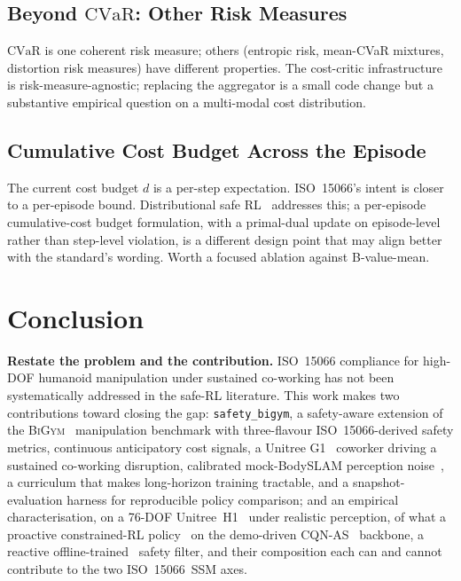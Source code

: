 \documentclass[11pt,a4paper]{report}
\newcommand{\ssm}{SSM}
\newcommand{\iso}{ISO~15066}
\newcommand{\cvar}{\ensuremath{\mathrm{CVaR}}}
\newcommand{\bigym}{\textsc{BiGym}}
\newcommand{\sbigym}{\texttt{safety\_bigym}}
\newcommand{\cqnas}{CQN-AS}
\newcommand{\bodyslampp}{BodySLAM\nolinebreak[4]\hspace{-.05em}\raisebox{.2ex}{\scriptsize ++}}
\begin{document}
\section{Beyond \cvar{}: Other Risk Measures}
\label{sec:fw:risk-measures}

\cvar{} is one coherent risk measure; others (entropic risk,
mean-CVaR mixtures, distortion risk measures) have different
properties. The cost-critic infrastructure is risk-measure-agnostic;
replacing the aggregator is a small code change but a substantive
empirical question on a multi-modal cost distribution.

\section{Cumulative Cost Budget Across the Episode}
\label{sec:fw:cumulative}

The current cost budget $d$ is a per-step expectation. \iso{}'s
intent is closer to a per-episode bound. Distributional safe
RL~\cite{yang2021wcsac} addresses this; a per-episode cumulative-cost
budget formulation, with a primal-dual update on episode-level
rather than step-level violation, is a different design point that
may align better with the standard's wording. Worth a focused
ablation against B-value-mean.


\chapter{Conclusion}
\label{ch:conclusion}

\noindent
\textbf{Restate the problem and the contribution.}
\iso{} compliance for high-DOF humanoid manipulation under
sustained co-working has not been systematically addressed in the
safe-RL literature. This work makes two contributions toward
closing the gap: \sbigym{}, a safety-aware extension of the
\bigym{}~\cite{chernyadev2024bigym} manipulation benchmark with
three-flavour \iso{}-derived safety metrics, continuous
anticipatory cost signals, a Unitree G1~\cite{unitree_g1} coworker
driving a sustained co-working disruption, calibrated mock-\bodyslampp{}
perception noise~\cite{henning2023bodyslampp}, a curriculum that
makes long-horizon training tractable, and a snapshot-evaluation
harness for reproducible policy comparison; and an empirical
characterisation, on a 76-DOF Unitree~H1~\cite{unitree_h1} under
realistic perception, of what a proactive constrained-RL
policy~\cite{stooke2020pid} on the demo-driven
\cqnas{}~\cite{seo2024cqnas} backbone, a reactive
offline-trained~\cite{kumar2020cql} safety filter, and their
composition each can and cannot contribute to the two \iso{}~\ssm{}
axes.
\end{document}
